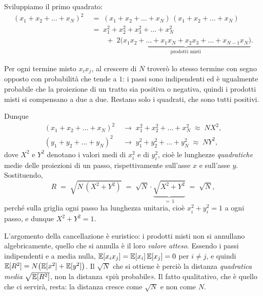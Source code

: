 Sviluppiamo il primo quadrato:
\begin{align*}
  (x_1 + x_2 + \dots + x_N)^{2}
    &\;=\; (x_1 + x_2 + \dots + x_N)\,(x_1 + x_2 + \dots + x_N)\\[2pt]
    &\;=\; x_1^{2} + x_2^{2} + x_3^{2} + \dots + x_N^{2}\\[4pt]
    &\qquad\;+\; 2\underbrace{\bigl(x_1x_2 + \dots + x_1x_N + x_2x_3 + \dots + x_{N-1}x_N\bigr)}_{\text{prodotti misti}} .
\end{align*}

\begin{osservazione}
Per ogni termine misto $x_i x_j$, al crescere di $N$ troverò lo stesso termine con segno
opposto con probabilità che tende a $1$: i passi sono indipendenti ed è ugualmente probabile
che la proiezione di un tratto sia positiva o negativa, quindi i prodotti misti si compensano
a due a due. Restano solo i quadrati, che sono tutti positivi.
\end{osservazione}

Dunque
\begin{align*}
  (x_1 + x_2 + \dots + x_N)^{2} &\;\longrightarrow\; x_1^{2} + x_2^{2} + \dots + x_N^{2} \;\approx\; N X^{2},\\
  (y_1 + y_2 + \dots + y_N)^{2} &\;\longrightarrow\; y_1^{2} + y_2^{2} + \dots + y_N^{2} \;\approx\; N Y^{2},
\end{align*}
dove $X^{2}$ e $Y^{2}$ denotano i valori medi di $x_i^{2}$ e di $y_i^{2}$, cioè le lunghezze
\emph{quadratiche} medie delle proiezioni di un passo, rispettivamente sull'asse $x$ e
sull'asse $y$. Sostituendo,
\[
  R \;=\; \sqrt{N\,(X^{2} + Y^{2})}
    \;=\; \sqrt{N}\cdot\underbrace{\sqrt{X^{2} + Y^{2}}}_{=\,1}
    \;=\; \sqrt{N},
\]
perché sulla griglia ogni passo ha lunghezza unitaria, cioè $x_i^{2}+y_i^{2}=1$ a ogni passo,
e dunque $X^{2}+Y^{2}=1$.

\begin{osservazione}
L'argomento della cancellazione è euristico: i prodotti misti non si annullano
algebricamente, quello che si annulla è il loro \emph{valore atteso}. Essendo i passi
indipendenti e a media nulla, $\mathbb{E}[x_i x_j] = \mathbb{E}[x_i]\,\mathbb{E}[x_j] = 0$ per $i \neq j$, e quindi
$\mathbb{E}[R^{2}] = N\bigl(\mathbb{E}[x^{2}] + \mathbb{E}[y^{2}]\bigr)$. Il $\sqrt{N}$ che si ottiene è perciò la
distanza \emph{quadratica media} $\sqrt{\mathbb{E}[R^{2}]}$, non la distanza «più probabile». Il
fatto qualitativo, che è quello che ci servirà, resta: la distanza cresce come $\sqrt{N}$ e
non come $N$.
\end{osservazione}

